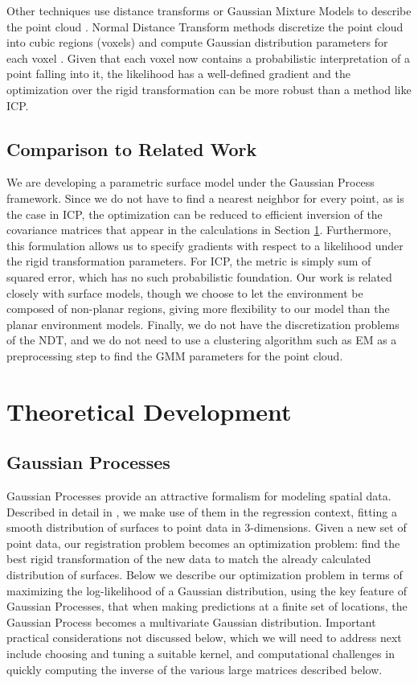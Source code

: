 \documentclass{article} %
\begin{document}
Other techniques use distance transforms or Gaussian Mixture Models to describe the point cloud\cite{tsin2004correlation} \cite{jian2005robust}. Normal Distance Transform methods discretize the point cloud into cubic regions (voxels) and compute Gaussian distribution parameters for each voxel \cite{biber2003normal}. Given that each voxel now contains a probabilistic interpretation of a point falling into it, the likelihood has a well-defined gradient and the optimization over the rigid transformation can be more robust than a method like ICP.

\subsection{Comparison to Related Work}

We are developing a parametric surface model under the Gaussian Process framework. Since we do not have to find a nearest neighbor for every point, as is the case in ICP, the optimization can be reduced to efficient inversion of the covariance matrices that appear in the calculations in Section \ref{sec:math}. Furthermore, this formulation allows us to specify gradients with respect to a likelihood under the rigid transformation parameters. For ICP, the metric is simply sum of squared error, which has no such probabilistic foundation. Our work is related closely with surface models, though we choose to let the environment be composed of non-planar regions, giving more flexibility to our model than the planar environment models. Finally, we do not have the discretization problems of the NDT, and we do not need to use a clustering algorithm such as EM as a preprocessing step to find the GMM parameters for the point cloud. 


\section{Theoretical Development}
\label{sec:math}

\subsection{Gaussian Processes}
Gaussian Processes provide an attractive formalism for modeling spatial data. Described in detail in \cite{rasmussen2006gaussian}, we make use of
them in the regression context, fitting a smooth distribution of surfaces to point data in 3-dimensions. Given a new set of point data, our registration problem becomes an optimization problem: find the best rigid transformation of the new data to match the already calculated distribution of surfaces. Below we describe our optimization problem in terms of
maximizing the log-likelihood of a Gaussian distribution, using the key feature of Gaussian Processes, that when making predictions at
a finite set of locations, the Gaussian Process becomes a multivariate Gaussian distribution. Important practical considerations not discussed below, which we will need to address next include choosing and tuning a suitable kernel, and computational challenges in quickly computing the inverse of the various large matrices described below.
\end{document}
